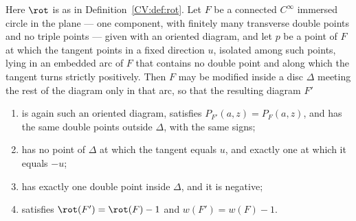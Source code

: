 \begin{lemma}\label{CV:lem:curl}\leanok
Here $\rot$ is as in Definition~\ref{CV:def:rot}.
Let $F$ be a connected $C^\infty$ immersed circle in the plane --- one
component, with finitely many transverse double points and no triple points ---
given with an oriented diagram, and let $p$ be a point of $F$ at which the
tangent points in a fixed direction $u$, isolated among such points, lying in
an embedded arc of $F$ that contains no double point and along which the tangent
turns strictly positively. Then $F$ may be modified inside a disc $\Delta$
meeting the rest of the diagram only in that arc, so that the resulting
diagram $F'$
\begin{enumerate}
\item[(i)] is again such an oriented diagram, satisfies
$P_{F'}(a,z)=P_F(a,z)$, and has the same double points outside $\Delta$, with
the same signs;
\item[(ii)] has no point of $\Delta$ at which the tangent equals $u$, and exactly
one at which it equals $-u$;
\item[(iii)] has exactly one double point inside $\Delta$, and it is negative;
\item[(iv)] satisfies $\rot(F')=\rot(F)-1$ and $w(F')=w(F)-1$.
\end{enumerate}
\end{lemma}
